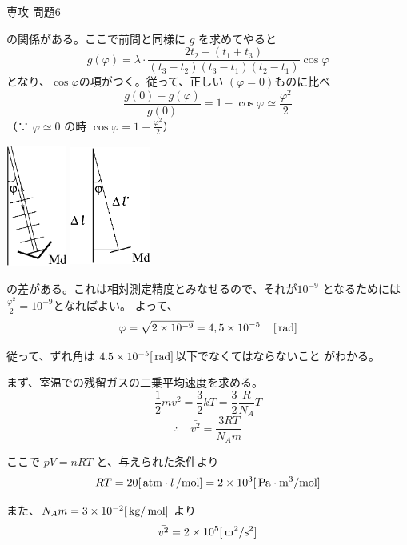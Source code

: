 \documentclass[fleqn]{jbook}
\begin{document}
\begin{answer}{専攻 問題6}{}
\begin{subanswers}
{の関係がある。ここで前問と同様に $g$ を求めてやると
\[ g(\varphi) = \lambda \cdot \frac{2t_2-(t_1+t_3)}{(t_3-t_2)(t_3-t_1)(t_2-t_1)} 
\cos \varphi \]
となり、$\cos \varphi$の項がつく。従って、正しい $(\varphi = 0)$ものに比べ
\[
\frac{g(0)-g(\varphi)}{g(0)} =  1-\cos \varphi \simeq \frac{\varphi ^2}{2} 
\]
（∵ $\varphi \simeq 0$ の時 $\cos \varphi = 1 - \frac{\varphi ^2}{2}$）
}\parbox[t]{60mm}{
\begin{center}
\includegraphics[clip,height=40mm,width=20mm]{1997phy6-6-1.eps}
\hspace{5mm}
\includegraphics[clip,height=40mm,width=26mm]{1997phy6-6-2.eps}
\end{center}
}

の差がある。これは相対測定精度とみなせるので、それが$10^{-9}$ となるためには$\frac{\varphi ^2}{2} = 10 ^{-9}$となればよい。 よって、
\[ \varphi = \sqrt{\mathstrut 2 \times 10^{-9}} = 4,5 \times 10^{-5} \quad {\,{\rm [{\,{\rm rad}}]}} \]

従って、ずれ角は \underline{$4.5 \times 10^{-5}[{\,{\rm rad}}]$}以下でなくてはならないこと
がわかる。

%
\SubAnswer

まず、室温での残留ガスの二乗平均速度を求める。
\[ \frac{1}{2} m\bar{{v}^2} = \frac{3}{2} kT = \frac{3}{2} \frac{R}{N_A} T \]
\[ \mbox{∴} \quad \bar{{v}^2} = \frac{3RT}{N_A m} \]

ここで $pV = nRT$ と、与えられた条件より
\[RT = 20 [\,{\rm atm} \cdot l {\,{\rm  / mol}}] = 2 \times 10^3 [{\,{\rm Pa \cdot m^3 / mol}} ]\]

また、$N_A m = 3 \times 10^{-2} [{\,{\rm kg}/ \,{\rm mol}}]$ より
\[\bar{{v}^2} = 2 \times 10^{5} [{\,{\rm m^2 / s^2}}]\]


\end{subanswers}
\end{answer}
\end{document}

